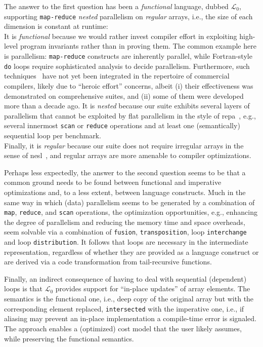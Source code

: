 \documentclass{sigplanconf}  %
\begin{document}
The answer to the first question has been %
a {\em functional} language, dubbed $\mathcal{L}_0$, supporting %
\texttt{map-reduce} {\em nested} parallelism on {\em regular} arrays, i.e., 
the size of each dimension is constant at runtime:\\
It is {\em functional} because we would rather invest compiler effort
in exploiting high-level program invariants rather than in proving them.
The common example here is parallelism: {\tt map-reduce} 
constructs are inherently parallel, while Fortran-style \texttt{do} 
loops require sophisticated analysis to decide parallelism. 
Furthermore, such techniques~\cite{Blume94RangeTest,SUIF,CosPLDI} %
have not yet been integrated in the repertoire of commercial compilers,
likely due to ``heroic effort'' concerns, albeit
 (i) their effectiveness was demonstrated on comprehensive suites, and
(ii) some of them were developed more than a decade ago.
%
It is {\em nested} because our suite exhibits several layers of 
parallelism that cannot be exploited by flat parallelism in the style of 
{\sc repa}~\cite{REPA}, e.g., several innermost {\tt scan} or 
{\tt reduce} operations and at least one (semantically)
sequential loop per benchmark.\\
%
Finally, it is {\em regular} because our suite does not require irregular 
arrays in the sense of {\sc nesl}~\cite{BlellochCACM96NESL}, and 
regular arrays are more amenable to compiler optimizations.

Perhaps less expectedly, the answer to the second question seems to be 
that a common ground needs to be found between functional and imperative
optimizations and, to a less extent,  between language constructs.
Much in the same way in which (data) parallelism seems to be generated by
a combination of {\tt map}, {\tt reduce}, and {\tt scan} operations, 
the optimization opportunities, e.g., enhancing the degree of parallelism 
and reducing  the memory time and space overheads, seem solvable via a 
combination of {\tt fusion}, {\tt transposition}, loop {\tt interchange} 
and loop {\tt distribution}.
%
It follows that loops are necessary in the intermediate representation,
regardless of whether they are provided as a language construct or are
derived via a code transformation from tail-recursive functions. 

Finally, an indirect consequence of having to deal with sequential (dependent) 
loops is that $\mathcal{L}_0$ provides support for ``in-place updates'' of 
array elements. The semantics is the functional one, i.e., %
deep copy of the original array but with the corresponding element replaced,
\texttt{intersected} with the imperative one, i.e., if aliasing may prevent 
an in-place implementation a compile-time error is signaled.   The approach
enables a (optimized) cost model that the user likely assumes, while 
preserving the functional semantics. 
\end{document}
